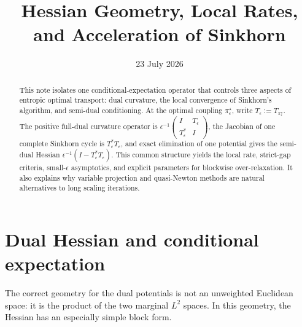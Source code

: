 \documentclass[11pt]{article}
\title{Hessian Geometry, Local Rates, and Acceleration of Sinkhorn}
\author{}
\date{23 July 2026}
\theoremstyle{definition}
\theoremstyle{remark}
\newcommand{\eps}{\epsilon}
\begin{document}
\maketitle

\begin{abstract}
This note isolates one conditional-expectation operator that controls
three aspects of entropic optimal transport: dual curvature, the local
convergence of Sinkhorn's algorithm, and semi-dual conditioning. At the
optimal coupling $\pi_\eps^\star$, write
$T_\eps:=T_{\pi_\eps^\star}$. The positive full-dual curvature operator is
$\eps^{-1}\left(\begin{smallmatrix}I&T_\eps\\T_\eps^\ast&I\end{smallmatrix}\right)$,
the Jacobian of one complete Sinkhorn cycle is $T_\eps^\ast T_\eps$, and exact
elimination of one potential gives the semi-dual Hessian
$\eps^{-1}(I-T_\eps^\ast T_\eps)$. This common structure yields the local rate,
strict-gap criteria, small-$\eps$ asymptotics, and explicit parameters
for blockwise over-relaxation. It also explains why variable
projection and quasi-Newton methods are natural alternatives to long
scaling iterations.
\end{abstract}

\section{Dual Hessian and conditional expectation}

The correct geometry for the dual potentials is not an unweighted
Euclidean space: it is the product of the two marginal $L^2$ spaces. In
this geometry, the Hessian has an especially simple block form.
\end{document}
